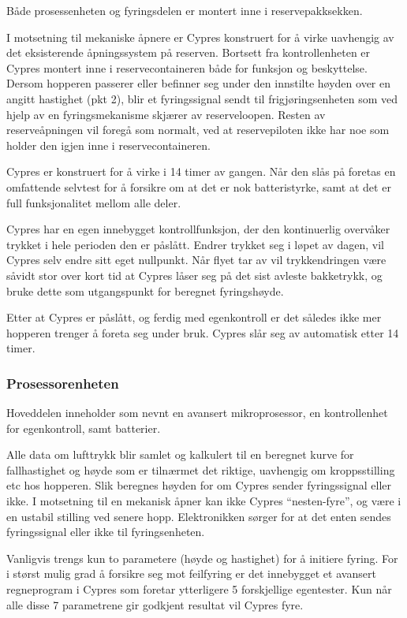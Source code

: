 Både prosessenheten og fyringsdelen er montert inne i reservepakksekken.

I motsetning til mekaniske åpnere er Cypres konstruert for å virke uavhengig av det eksisterende åpningssystem på reserven. Bortsett fra kontrollenheten er Cypres montert inne i reservecontaineren både for funksjon og beskyttelse. Dersom hopperen passerer eller befinner seg under den innstilte høyden over en angitt hastighet (pkt 2), blir et fyringssignal sendt til frigjøringsenheten som ved hjelp av en fyringsmekanisme skjærer av reserveloopen. Resten av reserveåpningen vil foregå som normalt, ved at reservepiloten ikke har noe som holder den igjen inne i reservecontaineren.

Cypres er konstruert for å virke i 14 timer av gangen. Når den slås på foretas en omfattende selvtest for å forsikre om at det er nok batteristyrke, samt at det er full funksjonalitet mellom alle deler.

Cypres har en egen innebygget kontrollfunksjon, der den kontinuerlig overvåker trykket i hele perioden den er påslått. Endrer trykket seg i løpet av dagen, vil Cypres selv endre sitt eget nullpunkt. Når flyet tar av vil trykkendringen være såvidt stor over kort tid at Cypres låser seg på det sist avleste bakketrykk, og bruke dette som utgangspunkt for beregnet fyringshøyde.

Etter at Cypres er påslått, og ferdig med egenkontroll er det således ikke mer hopperen trenger å foreta seg under bruk. Cypres slår seg av automatisk etter 14 timer.

\subsubsection{Prosessorenheten}
Hoveddelen inneholder som nevnt en avansert mikroprosessor, en kontrollenhet for egenkontroll, samt batterier.

Alle data om lufttrykk blir samlet og kalkulert til en beregnet kurve for fallhastighet og høyde som er tilnærmet det riktige, uavhengig om kroppsstilling etc hos hopperen. Slik beregnes høyden for om Cypres sender fyringssignal eller ikke. I motsetning til en mekanisk åpner kan ikke Cypres ``nesten-fyre'', og være i en ustabil stilling ved senere hopp. Elektronikken sørger for at det enten sendes fyringssignal eller ikke til fyringsenheten.

Vanligvis trengs kun to parametere (høyde og hastighet) for å initiere fyring. For i størst mulig grad å forsikre seg mot feilfyring er det innebygget et avansert regneprogram i Cypres som foretar ytterligere 5 forskjellige egentester. Kun når alle disse 7 parametrene gir godkjent resultat vil Cypres fyre.

